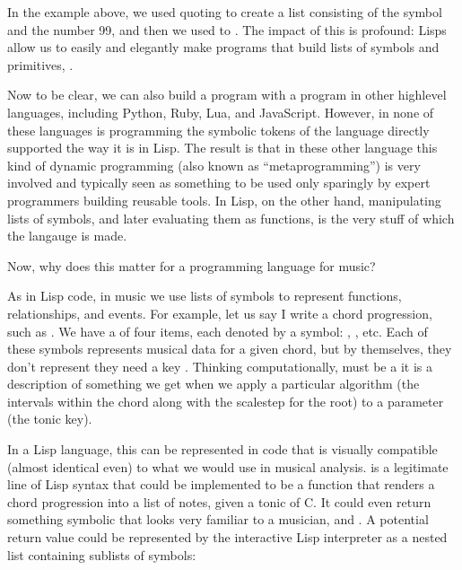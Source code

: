 \documentclass[letterpaper,10pt,english]{sphinxmanual}
\begin{document}
\sphinxAtStartPar
In the example above, we used quoting to create
a list consisting of the symbol  and the number 99, and then
we used  to .
The impact of this is profound:
Lisps allow us to easily and elegantly make programs that build lists of symbols and primitives,
.

\sphinxAtStartPar
Now to be clear, we can also build a program with a program in other high\sphinxhyphen{}level languages, including Python, Ruby, Lua, and JavaScript.
However, in none of these languages is programming  the symbolic tokens of the language directly supported the way it is in Lisp.
The result is that in these other language this kind of dynamic programming (also known as “meta\sphinxhyphen{}programming”) is very involved and
typically seen as something to be used only sparingly by expert programmers building reusable tools.
In Lisp, on the other hand, manipulating lists of symbols, and later evaluating them as functions, is the very stuff of which the langauge is made.

\sphinxAtStartPar
Now, why does this matter for a programming language for music?

\sphinxAtStartPar
As in Lisp code, in music we use lists of symbols to represent functions, relationships, and events.
For example, let us say I write a chord progression, such as .
We have a  of four items, each denoted by a symbol: , , etc.
Each of these symbols represents musical data for a given chord, but by themselves, they don’t represent  \sphinxhyphen{}
they need a key .
Thinking computationally,  must be a  \sphinxhyphen{} it is a description of something we get when we apply a
particular algorithm (the intervals within the chord along with the scale\sphinxhyphen{}step for the root) to a parameter (the tonic key).

\sphinxAtStartPar
In a Lisp language, this can be represented in code that is visually compatible (almost identical even) to what we would use in musical analysis.
 is a legitimate line of Lisp syntax that could be implemented to be a function
that renders a chord progression into a list of notes, given a tonic of C.
It could even return something symbolic that looks very familiar to a musician, and .
A potential return value could be represented by the interactive Lisp interpreter as a nested list containing sublists of symbols:
\end{document}
